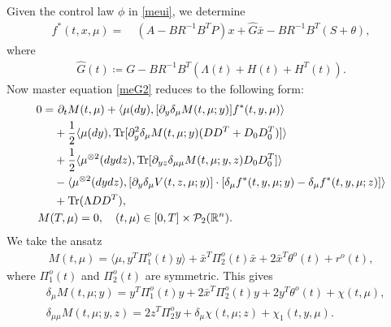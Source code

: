 \documentclass{amsart}
\theoremstyle{definition}
\theoremstyle{remark}
\def\cal{\mathcal}
\numberwithin{equation}{section}
\begin{document}
Given the control law $\phi$ in \eqref{meui},
 we determine
\begin{align*}
f^*(t, x,\mu)=\ & (A-BR^{-1} B^T P)x +\widehat G \bar x  - BR^{-1} B^T (S+\theta),
\end{align*}
where
\begin{align} \label{defwhg}
\widehat G(t)\coloneqq G- BR^{-1} B^T (\Lambda(t) +H(t)+H^T(t)).
\end{align}
Now master equation \eqref{meG2} reduces to the following form:
\begin{align}
0=&\ \partial_t M(t, \mu)+
\langle  \mu(dy) ,  [\partial_y \delta_\mu  M(t, \mu; y)] f^*(t, y, \mu)     \rangle \label{meG2a}\\
& +\frac12 \langle \mu(dy), \mbox{Tr} [\partial_{y}^2\delta_\mu M (t,\mu;y) (DD^T +D_0D_0^T)]\rangle \nonumber \\
& +\frac12 \langle \mu^{\otimes2}(dydz), \mbox{Tr}[ \partial_{yz}\delta_{\mu\mu} M (t,\mu;y,z) D_0D_0^T]\rangle \nonumber \\
& - \langle \mu^{\otimes2}(dydz), [\partial_{y}\delta_\mu V (t,z,\mu;y)]\cdot [\delta_\mu f^*(t,y,\mu;y)-\delta_\mu f^*(t,y,\mu;z) ]\rangle \nonumber \\
&+   \mbox{Tr}( \Lambda DD^T),  \nonumber\\
&\hskip -0.5cm  M(T,\mu)=0, \quad (t,\mu)\in[0,T]\times
 {\cal P}_2(\mathbb{R}^n).
\end{align}
We take the ansatz
\begin{align}
M(t,\mu)= \langle \mu, y^T \Pi_1^o(t) y\rangle +\bar x^T \Pi_2^o(t) \bar x +2\bar x^T \theta^o(t) +r^o(t),
\end{align}
where $ \Pi_1^o(t) $ and $\Pi_2^o(t)$ are symmetric.
This gives
\begin{align*}
&\delta_\mu M(t, \mu;y)=   y^T \Pi_1^o(t) y +2\bar x^T \Pi_2^o(t) y
+2y^T \theta^o(t)+\chi(t,\mu),\\
&\delta_{\mu\mu}M(t, \mu; y,z)= 2z^T \Pi_2^o y+ \delta_\mu \chi(t,\mu;z)+ \chi_1(t,y,\mu).
\end{align*}
\end{document}
